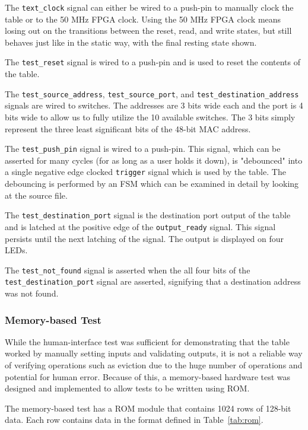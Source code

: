 \documentclass{article}
\begin{document}
The \texttt{text\_clock} signal can either be wired to a push-pin to manually clock the table or to the 50 MHz FPGA clock. Using the 50 MHz FPGA clock means losing out on the transitions between the reset, read, and write states, but still behaves just like in the static way, with the final resting state shown. 

The \texttt{test\_reset} signal is wired to a push-pin and is used to reset the contents of the table.

The \texttt{test\_source\_address}, \texttt{test\_source\_port}, and \texttt{test\_destination\_address} signals are wired to switches. The addresses are 3 bits wide each and the port is 4 bits wide to allow us to fully utilize the 10 available switches. The 3 bits simply represent the three least significant bits of the 48-bit MAC address.

The \texttt{test\_push\_pin} signal is wired to a push-pin. This signal, which can be asserted for many cycles (for as long as a user holds it down), is "debounced" into a single negative edge clocked \texttt{trigger} signal which is used by the table. The debouncing is performed by an FSM which can be examined in detail by looking at the source file.

The \texttt{test\_destination\_port} signal is the destination port output of the table and is latched at the positive edge of the \texttt{output\_ready} signal. This signal persists until the next latching of the signal. The output is displayed on four LEDs.

The \texttt{test\_not\_found} signal is asserted when the all four bits of the \texttt{test\_destination\_port} signal are asserted, signifying that a destination address was not found.

\subsubsection{Memory-based Test}

While the human-interface test was sufficient for demonstrating that the table worked by manually setting inputs and validating outputs, it is not a reliable way of verifying operations such as eviction due to the huge number of operations and potential for human error. Because of this, a memory-based hardware test was designed and implemented to allow tests to be written using ROM.

The memory-based test has a ROM module that contains 1024 rows of 128-bit data. Each row contains data in the format defined in Table~\ref{tab:rom}. 
\end{document}
